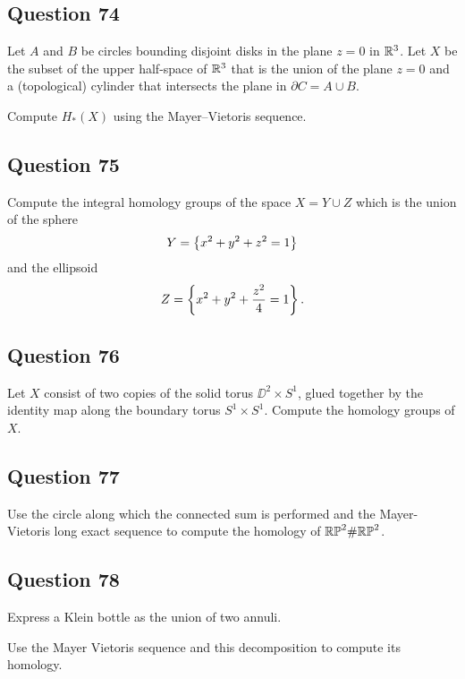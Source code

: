 \documentclass[12pt]{article}
\begin{document}
\hypertarget{question-74-3}{%
\subsection{Question 74}\label{question-74-3}}

Let \(A\) and \(B\) be circles bounding disjoint disks in the plane
\(z = 0\) in \({\mathbb{R}}^3\). Let \(X\) be the subset of the upper half-space
of \({\mathbb{R}}^3\) that is the union of the plane \(z = 0\) and a
(topological) cylinder that intersects the plane in
\(\partial C = A \cup B\).

Compute \(H_* (X)\) using the Mayer--Vietoris sequence.

\hypertarget{question-75-3}{%
\subsection{Question 75}\label{question-75-3}}

Compute the integral homology groups of the space \(X = Y \cup Z\) which
is the union of the sphere \[
Y = \left\{{x^2 + y^2 + z^2 = 1}\right\}
\] and the ellipsoid \[
Z =  \left\{{x^2 + y^2 + {z^2 \over 4} = 1}\right\}
.\]

\hypertarget{question-76-3}{%
\subsection{Question 76}\label{question-76-3}}

Let \(X\) consist of two copies of the solid torus \(\DD^2 \times S^1\),
glued together by the identity map along the boundary torus
\(S^1 \times S^1\). Compute the homology groups of \(X\).

\hypertarget{question-77-3}{%
\subsection{Question 77}\label{question-77-3}}

Use the circle along which the connected sum is performed and the
Mayer-Vietoris long exact sequence to compute the homology of
\({\mathbb{RP}}^2 \# {\mathbb{RP}}^2\).

\hypertarget{question-78-3}{%
\subsection{Question 78}\label{question-78-3}}

Express a Klein bottle as the union of two annuli.

Use the Mayer Vietoris sequence and this decomposition to compute its
homology.
\end{document}
